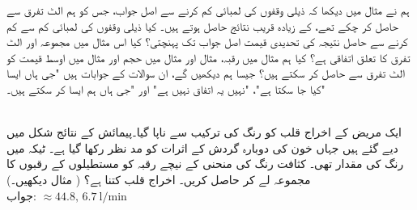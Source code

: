 ہم نے مثال  میں دیکھا کہ ذیلی وقفوں کی لمبائی کم کرنے سے اصل جواب، جس کو ہم الٹ تفرق سے حاصل کر چکے تھے،  کے زیادہ قریب نتائج حاصل ہوتے ہیں۔ کیا ذیلی وقفوں کی لمبائی کم سے کم کرنے سے حاصل نتیجہ کی تحدیدی قیمت اصل جواب تک پہنچتی؟ کیا اس مثال میں مجموعہ اور الٹ تفرق کا تعلق اتفاقی ہے؟ کیا ہم مثال  میں رقبہ، مثال  اور مثال  میں حجم اور مثال  میں اوسط قیمت کو الٹ تفرق سے حاصل کر سکتے ہیں؟ جیسا ہم دیکھیں گے،  ان سوالات کے جوابات ہیں "جی ہاں ایسا کیا جا سکتا ہے"، "نہیں یہ اتفاق نہیں ہے" اور "جی ہاں ہم ایسا کر سکتے ہیں۔"

\\
ایک مریض کے اخراج قلب کو رنگ کی ترکیب سے ناپا گیا۔پیمائش کے نتائج  شکل   میں دیے گئے ہیں جہاں خون کی دوبارہ گردش کے اثرات کو مد نظر رکھا گیا ہے۔ ٹیکہ میں رنگ کی مقدار  تھی۔ کثافت رنگ کی منحنی کے نیچے رقبہ کو مستطیلوں کے رقبوں کا مجموعہ لے کر حاصل کریں۔ اخراج قلب کتنا ہے؟ ( مثال  دیکھیں۔)\\
جواب:\quad
$\approx 44.8,\, \SI{6.7}{\litre\per\minute}$
